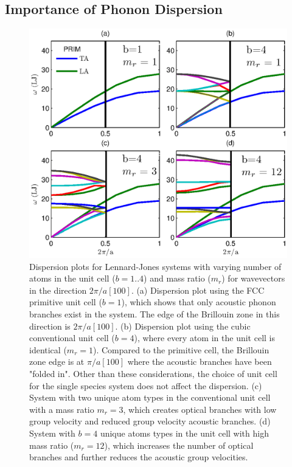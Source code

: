\documentclass[letterpaper,12pt]{article}
\begin{document}
\subsection{\label{S-Prelim-Phonon-Dispersion}Importance of Phonon Dispersion}
\begin{figure}
\begin{center}
\includegraphics[scale=0.6]{GULP_disp_mass_ratio.eps}
\vspace*{-5mm}
\end{center}
\caption{\label{FIG:crys_disp_mass_ratio} Dispersion plots for Lennard-Jones systems with varying number of atoms in the unit cell ($b=1..4$) and mass ratio ($m_r$) for wavevectors in the direction $2\pi/a[1 0 0]$. (a) Dispersion plot using the FCC primitive unit cell ($b=1$), which shows that only acoustic phonon branches exist in the system. The edge of the Brillouin zone in this direction is $2\pi/a[1 0 0]$. (b) Dispersion plot using the cubic conventional unit cell ($b=4$), where every atom in the unit cell is identical ($m_r=1$). Compared to the primitive cell, the Brillouin zone edge is at $\pi/a[1 0 0]$ where the acoustic branches have been "folded in".\cite{turneythesis} Other than these considerations, the choice of unit cell for the single species system does not affect the dispersion. (c) System with two unique atom types in the conventional unit cell with a mass ratio $m_r=3$, which creates optical branches with low group velocity and reduced group velocity acoustic branches. (d) System with $b=4$ unique atoms types in the unit cell with high mass ratio ($m_r=12$), which increases the number of optical branches and further reduces the acoustic group velocities. }
\end{figure}
\end{document}
